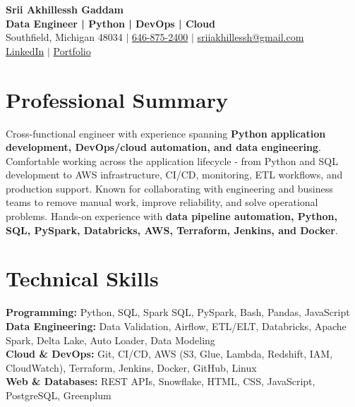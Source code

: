 \documentclass[letterpaper,10pt]{article}
\begin{document}
\fontsize{9.35pt}{10.45pt}\selectfont

\begin{center}
    {\LARGE \textbf{Srii Akhillessh Gaddam}} \\[-1pt]
    \textbf{Data Engineer | Python | DevOps | Cloud} \\[2pt]
    Southfield, Michigan 48034 $|$
    \href{tel:6468752400}{646-875-2400} $|$
    \href{mailto:sriiakhillessh@gmail.com}{sriiakhillessh@gmail.com} \\[1pt]
    \href{https://www.linkedin.com/in/srii-akhiilessh-gaddam-b48668191/}{LinkedIn} $|$
    \href{https://sriiakhillesshg.github.io/portfolio/}{Portfolio}
\end{center}
\vspace{-8pt}

\section{Professional Summary}
\small{Cross-functional engineer with experience spanning \textbf{Python application development, DevOps/cloud automation, and data engineering}. Comfortable working across the application lifecycle - from Python and SQL development to AWS infrastructure, CI/CD, monitoring, ETL workflows, and production support. Known for collaborating with engineering and business teams to remove manual work, improve reliability, and solve operational problems. Hands-on experience with \textbf{data pipeline automation, Python, SQL, PySpark, Databricks, AWS, Terraform, Jenkins, and Docker}.}

\section{Technical Skills}
\small{
\textbf{Programming:} Python, SQL, Spark SQL, PySpark, Bash, Pandas, JavaScript \\
\textbf{Data Engineering:} Data Validation, Airflow, ETL/ELT, Databricks, Apache Spark, Delta Lake, Auto Loader, Data Modeling \\
\textbf{Cloud \& DevOps:} Git, CI/CD, AWS (S3, Glue, Lambda, Redshift, IAM, CloudWatch), Terraform, Jenkins, Docker, GitHub, Linux \\
\textbf{Web \& Databases:} REST APIs, Snowflake, HTML, CSS, JavaScript, PostgreSQL, Greenplum
}

\end{document}
